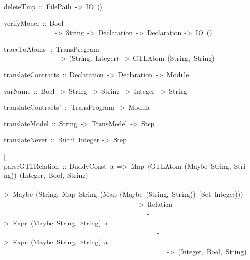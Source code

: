 \begin{haddockdesc}
\item[
deleteTmp\ ::\ FilePath\ ->\ IO\ ()
]
\item[
verifyModel\ ::\ Bool\\\ \ \ \ \ \ \ \ \ \ \ \ \ \ \ ->\ String\ ->\ {\char 91}Declaration{\char 93}\ ->\ {\char 91}Declaration{\char 93}\ ->\ IO\ ()
]
\item[
traceToAtoms\ ::\ TransProgram\\\ \ \ \ \ \ \ \ \ \ \ \ \ \ \ \ ->\ {\char 91}(String,\ Integer){\char 93}\ ->\ {\char 91}{\char 91}GTLAtom\ (String,\ String){\char 93}{\char 93}
]
\item[
translateContracts\ ::\ {\char 91}Declaration{\char 93}\ ->\ {\char 91}Declaration{\char 93}\ ->\ {\char 91}Module{\char 93}
]
\item[
varName\ ::\ Bool\ ->\ String\ ->\ String\ ->\ Integer\ ->\ String
]
\item[
translateContracts'\ ::\ TransProgram\ ->\ {\char 91}Module{\char 93}
]
\item[
translateModel\ ::\ String\ ->\ TransModel\ ->\ {\char 91}Step{\char 93}
]
\item[
translateNever\ ::\ Buchi\ {\char 91}Integer{\char 93}\ ->\ {\char 91}Step{\char 93}
]
\item[
parseGTLAtom\ ::\ Map\ (GTLAtom\ (Maybe\ String,\ String))\ (Integer,\ Bool,\ String)\\\ \ \ \ \ \ \ \ \ \ \ \ \ \ \ \ ->\ Maybe\ (String,\ Map\ String\ (Map\ (Maybe\ (String,\ String))\ (Set\ Integer)))\\\ \ \ \ \ \ \ \ \ \ \ \ \ \ \ \ \ \ \ ->\ GTLAtom\ (Maybe\ String,\ String)\\\ \ \ \ \ \ \ \ \ \ \ \ \ \ \ \ \ \ \ \ \ \ ->\ ((Integer,\ Bool),\ Map\ (GTLAtom\ (Maybe\ String,\ String))\ (Integer,\ Bool,\ String))
]
\item[
parseGTLRelation\ ::\ BuddyConst\ a\ =>\ Map\ (GTLAtom\ (Maybe\ String,\ String))\ (Integer,\ Bool,\ String)\\\ \ \ \ \ \ \ \ \ \ \ \ \ \ \ \ \ \ \ \ \ \ \ \ \ \ \ \ \ \ \ \ \ \ \ \ ->\ Maybe\ (String,\ Map\ String\ (Map\ (Maybe\ (String,\ String))\ (Set\ Integer)))\\\ \ \ \ \ \ \ \ \ \ \ \ \ \ \ \ \ \ \ \ \ \ \ \ \ \ \ \ \ \ \ \ \ \ \ \ \ \ \ ->\ Relation\\\ \ \ \ \ \ \ \ \ \ \ \ \ \ \ \ \ \ \ \ \ \ \ \ \ \ \ \ \ \ \ \ \ \ \ \ \ \ \ \ \ \ ->\ Expr\ (Maybe\ String,\ String)\ a\\\ \ \ \ \ \ \ \ \ \ \ \ \ \ \ \ \ \ \ \ \ \ \ \ \ \ \ \ \ \ \ \ \ \ \ \ \ \ \ \ \ \ \ \ \ ->\ Expr\ (Maybe\ String,\ String)\ a\\\ \ \ \ \ \ \ \ \ \ \ \ \ \ \ \ \ \ \ \ \ \ \ \ \ \ \ \ \ \ \ \ \ \ \ \ \ \ \ \ \ \ \ \ \ \ \ \ ->\ (Integer,\ Bool,\ String)

\end{haddockdesc}
